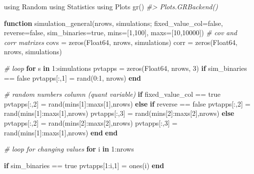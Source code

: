 \documentclass[]{article}
\newenvironment{Shaded}{\begin{snugshade}}{\end{snugshade}}
\newcommand{\CommentTok}[1]{\textcolor[rgb]{0.56,0.35,0.01}{\textit{#1}}}
\newcommand{\DataTypeTok}[1]{\textcolor[rgb]{0.13,0.29,0.53}{#1}}
\newcommand{\FloatTok}[1]{\textcolor[rgb]{0.00,0.00,0.81}{#1}}
\newcommand{\KeywordTok}[1]{\textcolor[rgb]{0.13,0.29,0.53}{\textbf{#1}}}
\newcommand{\NormalTok}[1]{#1}
\begin{document}
\begin{Shaded}
\begin{Highlighting}[]
\NormalTok{using Random}
\NormalTok{using Statistics}
\NormalTok{using Plots}
\NormalTok{gr()}
\CommentTok{#> Plots.GRBackend()}

\KeywordTok{function}\NormalTok{ simulation_general(nrows, simulations; fixed_value_col=false, reverse=false,}
\NormalTok{                             sim_binaries=true, mins=[}\FloatTok{1}\NormalTok{,}\FloatTok{100}\NormalTok{], maxs=[}\FloatTok{10}\NormalTok{,}\FloatTok{10000}\NormalTok{]) }
    \CommentTok{# cov and corr matrixes}
\NormalTok{    covs = zeros(}\DataTypeTok{Float64}\NormalTok{, nrows, simulations)}
\NormalTok{    corr = zeros(}\DataTypeTok{Float64}\NormalTok{, nrows, simulations)}

    \CommentTok{# loop}
    \KeywordTok{for}\NormalTok{ s }\KeywordTok{in} \FloatTok{1}\NormalTok{:simulations}
\NormalTok{        pvtapps = zeros(}\DataTypeTok{Float64}\NormalTok{, nrows, }\FloatTok{3}\NormalTok{)}
        \KeywordTok{if}\NormalTok{ sim_binaries == false}
\NormalTok{            pvtapps[:,}\FloatTok{1}\NormalTok{] = rand(}\FloatTok{0}\NormalTok{:}\FloatTok{1}\NormalTok{, nrows)}
        \KeywordTok{end}

        \CommentTok{# random numbers column (quant variable)}
        \KeywordTok{if}\NormalTok{ fixed_value_col == true}
\NormalTok{            pvtapps[:,}\FloatTok{2}\NormalTok{] = rand(mins[}\FloatTok{1}\NormalTok{]:maxs[}\FloatTok{1}\NormalTok{],nrows)}
        \KeywordTok{else}
            \KeywordTok{if}\NormalTok{ reverse == false}
\NormalTok{                pvtapps[:,}\FloatTok{2}\NormalTok{] = rand(mins[}\FloatTok{1}\NormalTok{]:maxs[}\FloatTok{1}\NormalTok{],nrows)}
\NormalTok{                pvtapps[:,}\FloatTok{3}\NormalTok{] = rand(mins[}\FloatTok{2}\NormalTok{]:maxs[}\FloatTok{2}\NormalTok{],nrows)}
            \KeywordTok{else} 
\NormalTok{                pvtapps[:,}\FloatTok{2}\NormalTok{] = rand(mins[}\FloatTok{2}\NormalTok{]:maxs[}\FloatTok{2}\NormalTok{],nrows)}
\NormalTok{                pvtapps[:,}\FloatTok{3}\NormalTok{] = rand(mins[}\FloatTok{1}\NormalTok{]:maxs[}\FloatTok{1}\NormalTok{],nrows)}
            \KeywordTok{end}
        \KeywordTok{end}

        \CommentTok{# loop for changing values}
        \KeywordTok{for}\NormalTok{ i }\KeywordTok{in} \FloatTok{1}\NormalTok{:nrows}

            \KeywordTok{if}\NormalTok{ sim_binaries == true}
\NormalTok{                pvtapps[}\FloatTok{1}\NormalTok{:i,}\FloatTok{1}\NormalTok{] = ones(i)}
            \KeywordTok{end}


\end{Highlighting}
\end{Shaded}
\end{document}

